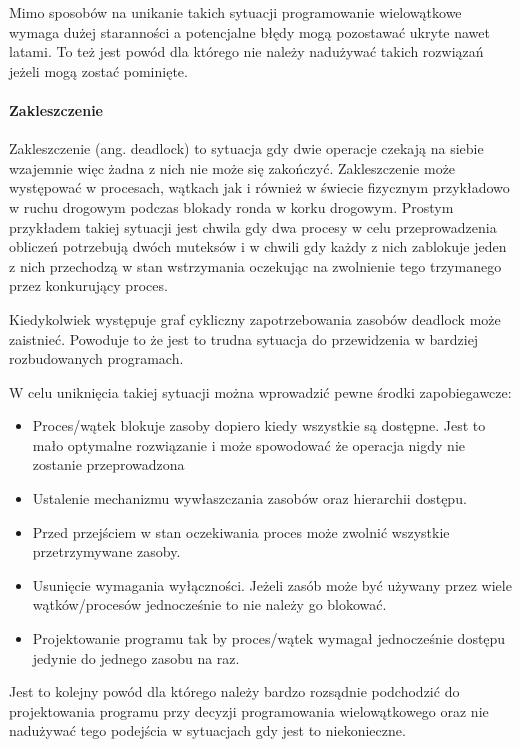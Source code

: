 Mimo sposobów na unikanie takich sytuacji programowanie wielowątkowe wymaga dużej staranności a potencjalne błędy mogą pozostawać ukryte nawet latami. To też jest powód dla którego nie należy nadużywać takich rozwiązań jeżeli mogą zostać pominięte\cite{multi thread problem}.
\paragraph{Zakleszczenie}

Zakleszczenie (ang. deadlock) to sytuacja gdy dwie operacje czekają na siebie wzajemnie więc żadna z nich nie może się zakończyć. 
Zakleszczenie może występować w procesach, wątkach jak i również w świecie fizycznym przykładowo w ruchu drogowym podczas blokady ronda w korku drogowym.  
Prostym przykładem takiej sytuacji jest chwila gdy dwa procesy w celu przeprowadzenia obliczeń potrzebują dwóch muteksów i w chwili gdy każdy z nich zablokuje jeden z nich przechodzą w stan wstrzymania oczekując na zwolnienie tego trzymanego przez konkurujący proces. 

 Kiedykolwiek występuje graf cykliczny zapotrzebowania zasobów deadlock może zaistnieć. 
 Powoduje to że jest to trudna sytuacja do przewidzenia w bardziej rozbudowanych programach.

W celu uniknięcia takiej sytuacji można wprowadzić pewne środki zapobiegawcze\cite{coffman}:
\begin{itemize}
        \item Proces/wątek blokuje zasoby dopiero kiedy wszystkie są dostępne. Jest to mało optymalne rozwiązanie i może spowodować że operacja nigdy nie zostanie przeprowadzona
        \item Ustalenie mechanizmu wywłaszczania zasobów oraz hierarchii dostępu. 
        \item Przed przejściem w stan oczekiwania proces może zwolnić wszystkie przetrzymywane zasoby. 
        \item Usunięcie wymagania wyłączności. Jeżeli zasób może być używany przez wiele wątków/procesów jednocześnie to nie należy go blokować.  
        \item Projektowanie programu tak by proces/wątek wymagał jednocześnie dostępu jedynie do jednego zasobu na raz. 
\end{itemize} 

Jest to kolejny powód dla którego należy bardzo rozsądnie podchodzić do projektowania programu przy decyzji programowania wielowątkowego oraz nie nadużywać tego podejścia w sytuacjach gdy jest to niekonieczne\cite{multi thread problem}. 

